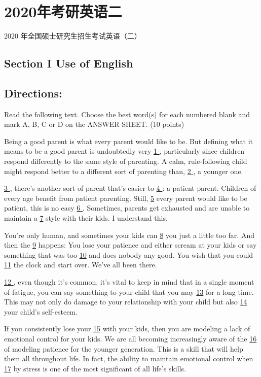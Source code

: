 \documentclass[UTF8,11pt]{ctexart}
\begin{document}
\section*{2020年考研英语二}
2020 年全国硕士研究生招生考试英语（二）


\subsection*{\textbf{Section I Use of English}}


\subsection*{\textbf{Directions:}}


Read the following text. Choose the best word(s) for each numbered blank and mark A, B, C or D on the ANSWER SHEET. (10 points)


Being a good parent is what every parent would like to be. But defining what it means to be a good parent is undoubtedly very \uline{1 }, particularly since children respond differently to the same style of parenting. A calm, rule-following child might respond better to a different sort of parenting than, \uline{2 }, a younger one.


\uline{3 }, there’s another sort of parent that’s easier to \uline{4 }: a patient parent. Children of every age benefit from patient parenting. Still, \uline{5} every parent would like to be patient, this is no easy \uline{6 }. Sometimes, parents get exhausted and are unable to maintain a \uline{7} style with their kids. I understand this.


You’re only human, and sometimes your kids can \uline{8} you just a little too far. And then the \uline{9} happens: You lose your patience and either scream at your kids or say something that was too \uline{10} and does nobody any good. You wish that you could \uline{11} the clock and start over. We’ve all been there.


\uline{12 }, even though it’s common, it’s vital to keep in mind that in a single moment of fatigue, you can say something to your child that you may \uline{13} for a long time. This may not only do damage to your relationship with your child but also \uline{14} your child’s self-esteem.


If you consistently lose your \uline{15} with your kids, then you are modeling a lack of emotional control for your kids. We are all becoming increasingly aware of the \uline{16} of modeling patience for the younger generation. This is a skill that will help them all throughout life. In fact, the ability to maintain emotional control when \uline{17} by stress is one of the most significant of all life’s skills.
\end{document}
